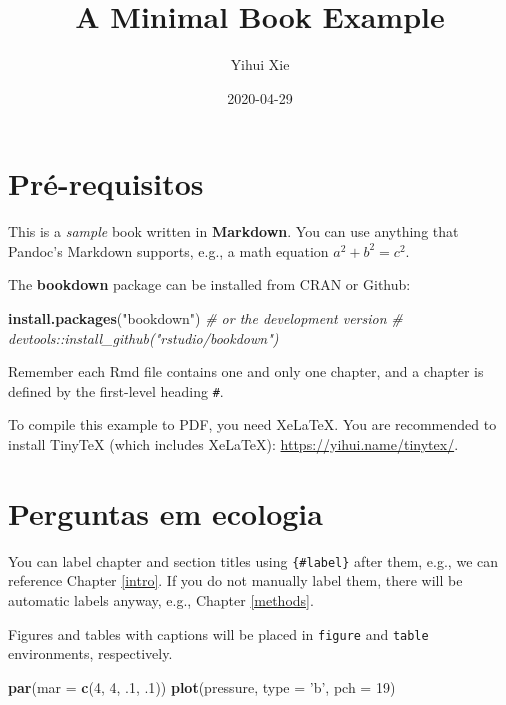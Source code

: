 \documentclass[]{book}
\title{A Minimal Book Example}
\author{Yihui Xie}
\date{2020-04-29}
\newenvironment{Shaded}{\begin{snugshade}}{\end{snugshade}}
\newcommand{\CommentTok}[1]{\textcolor[rgb]{0.56,0.35,0.01}{\textit{#1}}}
\newcommand{\DataTypeTok}[1]{\textcolor[rgb]{0.13,0.29,0.53}{#1}}
\newcommand{\DecValTok}[1]{\textcolor[rgb]{0.00,0.00,0.81}{#1}}
\newcommand{\FloatTok}[1]{\textcolor[rgb]{0.00,0.00,0.81}{#1}}
\newcommand{\KeywordTok}[1]{\textcolor[rgb]{0.13,0.29,0.53}{\textbf{#1}}}
\newcommand{\NormalTok}[1]{#1}
\newcommand{\StringTok}[1]{\textcolor[rgb]{0.31,0.60,0.02}{#1}}
\begin{document}
\maketitle

{
\setcounter{tocdepth}{1}
\tableofcontents
}
\hypertarget{pruxe9-requisitos}{%
\chapter{Pré-requisitos}\label{pruxe9-requisitos}}

This is a \emph{sample} book written in \textbf{Markdown}. You can use anything that Pandoc's Markdown supports, e.g., a math equation \(a^2 + b^2 = c^2\).

The \textbf{bookdown} package can be installed from CRAN or Github:

\begin{Shaded}
\begin{Highlighting}[]
\KeywordTok{install.packages}\NormalTok{(}\StringTok{"bookdown"}\NormalTok{)}
\CommentTok{# or the development version}
\CommentTok{# devtools::install_github("rstudio/bookdown")}
\end{Highlighting}
\end{Shaded}

Remember each Rmd file contains one and only one chapter, and a chapter is defined by the first-level heading \texttt{\#}.

To compile this example to PDF, you need XeLaTeX. You are recommended to install TinyTeX (which includes XeLaTeX): \url{https://yihui.name/tinytex/}.

\hypertarget{cap1}{%
\chapter{Perguntas em ecologia}\label{cap1}}

You can label chapter and section titles using \texttt{\{\#label\}} after them, e.g., we can reference Chapter \ref{intro}. If you do not manually label them, there will be automatic labels anyway, e.g., Chapter \ref{methods}.

Figures and tables with captions will be placed in \texttt{figure} and \texttt{table} environments, respectively.

\begin{Shaded}
\begin{Highlighting}[]
\KeywordTok{par}\NormalTok{(}\DataTypeTok{mar =} \KeywordTok{c}\NormalTok{(}\DecValTok{4}\NormalTok{, }\DecValTok{4}\NormalTok{, }\FloatTok{.1}\NormalTok{, }\FloatTok{.1}\NormalTok{))}
\KeywordTok{plot}\NormalTok{(pressure, }\DataTypeTok{type =} \StringTok{'b'}\NormalTok{, }\DataTypeTok{pch =} \DecValTok{19}\NormalTok{)}
\end{Highlighting}
\end{Shaded}
\end{document}
